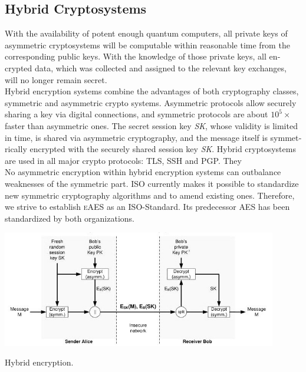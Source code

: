 \documentclass[a4paper,11pt]{article}
\begin{document}
\begin{otherlanguage}{english}
\subsection{Hybrid Cryptosystems}

\noindent
With the availability of potent enough quantum computers, all private keys of asymmetric cryptosystems will be computable within reasonable time from the corresponding public keys. With the knowledge of those private keys, all encrypted data, which was collected and assigned to the relevant key exchanges, will no longer remain secret. \\

\noindent
Hybrid encryption systems combine the advantages of both cryptography classes, symmetric and asymmetric crypto systems. Asymmetric protocols allow securely sharing a key via digital connections, and symmetric protocols are about $10^5 \times$ faster than asymmetric ones. The secret session key \textit{SK}, whose validity is limited in time, is shared via asymmetric cryptography, and the message itself is symmetrically encrypted with the securely shared session key \textit{SK}. Hybrid cryptosystems are used in all major crypto protocols: TLS, SSH and PGP. They\\

\noindent
No asymmetric encryption within hybrid encryption systems can outbalance weaknesses of the symmetric part. ISO currently makes it possible to standardize new symmetric cryptography algorithms and to amend existing ones. Therefore, we strive to establish \textsc{eAES} as an ISO-Standard. Its predecessor \textsc{AES} has been standardized by both organizations. \\

\begin{figurehere}
  \centering
  \includegraphics[width=12cm]{hybrid-encryption.jpg}
  \caption{Hybrid encryption.\label{abb_2}}
\end{figurehere}

\vspace{0.3cm} 






\end{otherlanguage}
\end{document}
